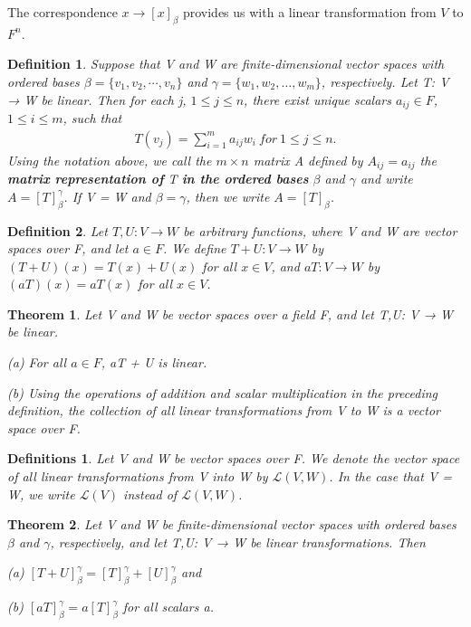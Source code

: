\documentclass{article}
\newcommand{\bd}[1]{\textbf{#1}}
\theoremstyle{plain}
\newtheorem{theorem}{Theorem}[section]
\newtheorem*{definition1}{Definition}
\newtheorem*{definitions}{Definitions}
\theoremstyle{plain} %
\begin{document}
The correspondence $x \to [x]_\beta$ provides us with a linear transformation from $V$ to $F^n$.

\begin{definition1}
Suppose that V and W are finite-dimensional vector spaces with ordered bases $\beta = \{v_1, v_2, \cdots ,v_n\}$ and $\gamma = \{w_1, w_2, \ldots ,w_m\}$, respectively. Let T: V → W be linear. Then for each j, $1 \leq  j \leq  n$, there exist unique scalars $a_{ij} \in F$, $1 \leq  i \leq  m$, such that
\begin{align*}
T(v_j ) =  \sum_{i=1}^m a_{ij}w_i~for~1\leq  j \leq n.
\end{align*}
Using the notation above, we call the $m\times n$ matrix A defined by $A_{ij} = a_{ij}$ the \bd{matrix representation of} T \bd{in the ordered bases} $\beta$ and $\gamma$ and write $A = [T]^\gamma_\beta$. If V = W and $\beta = \gamma$, then we write $A = [T]_\beta$.
\end{definition1}

\begin{definition1}
Let $T,U: V \to W$ be arbitrary functions, where V and W are vector spaces over F, and let $a \in F$. We define $T + U: V \to W$ by $(T + U)(x) = T(x) + U(x)$ for all $x \in V$, and $aT: V \to W$ by $(aT)(x) = aT(x)$ for all $x \in V$.
\end{definition1}

\begin{theorem}
Let V and W be vector spaces over a field F, and let T,U: V → W be linear.

(a) For all $a \in F$, aT + U is linear.

(b) Using the operations of addition and scalar multiplication in the preceding definition, the collection of all linear transformations from V to W is a vector space over F.
\end{theorem}

\begin{definitions}
Let V and W be vector spaces over F. We denote the vector space of all linear transformations from V into W by $\mathcal L(V, W)$. In the case that V = W, we write $\mathcal L(V)$ instead of $\mathcal L(V, W)$.
\end{definitions}

\begin{theorem}
Let V and W be finite-dimensional vector spaces with ordered bases $\beta$ and $\gamma$, respectively, and let T,U: V → W be linear transformations. Then

(a) $[T + U]^\gamma_\beta = [T]^\gamma_\beta+ [U]^\gamma_\beta$ and

(b) $[aT]^\gamma_\beta = a[T]^\gamma_\beta$ for all scalars a.
\end{theorem}
\end{document}
